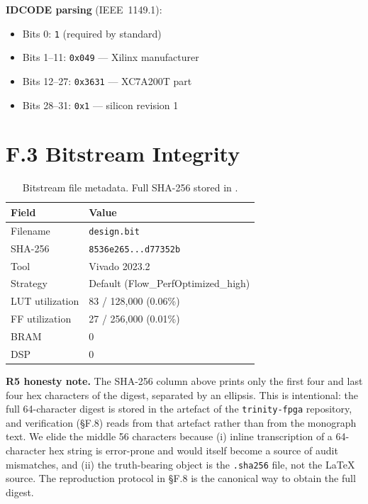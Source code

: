 \textbf{IDCODE parsing} (IEEE~1149.1):
\begin{itemize}
  \item Bits 0: \texttt{1} (required by standard)
  \item Bits 1--11: \texttt{0x049} --- Xilinx manufacturer
  \item Bits 12--27: \texttt{0x3631} --- XC7A200T part
  \item Bits 28--31: \texttt{0x1} --- silicon revision 1
\end{itemize}

\section*{F.3 Bitstream Integrity}
\label{sec:appF-integrity}

\begin{table}[h]
\centering
\begin{tabular}{ll}
\toprule
\textbf{Field} & \textbf{Value} \\
\midrule
Filename & \texttt{design.bit} \\
SHA-256 & \texttt{8536e265...d77352b} \\
Tool & Vivado 2023.2 \\
Strategy & Default (Flow\_PerfOptimized\_high) \\
LUT utilization & 83 / 128,000 (0.06\%) \\
FF utilization & 27 / 256,000 (0.01\%) \\
BRAM & 0 \\
DSP & 0 \\
\bottomrule
\end{tabular}
\caption{Bitstream file metadata. Full SHA-256 stored in
.}
\end{table}

\textbf{R5 honesty note.} The SHA-256 column above prints only the first
four and last four hex characters of the digest, separated by an
ellipsis. This is intentional: the full 64-character digest is stored
in the artefact  of
the \texttt{trinity-fpga} repository, and verification (\S F.8) reads
from that artefact rather than from the monograph text. We elide the
middle 56 characters because (i) inline transcription of a 64-character
hex string is error-prone and would itself become a source of audit
mismatches, and (ii) the truth-bearing object is the \texttt{.sha256}
file, not the LaTeX source. The reproduction protocol in \S F.8 is the
canonical way to obtain the full digest.

